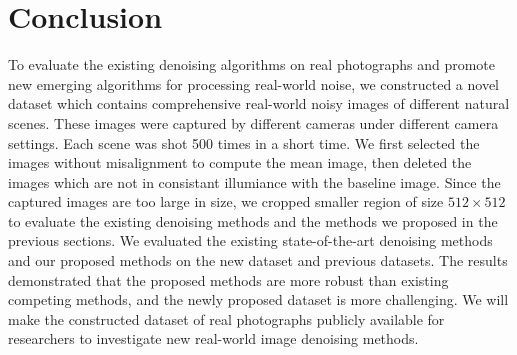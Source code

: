 \section{Conclusion}

To evaluate the existing denoising algorithms on real photographs and promote new emerging algorithms for processing real-world noise, we constructed a novel dataset which contains comprehensive real-world noisy images of different natural scenes. These images were captured by different cameras under different camera settings. Each scene was shot 500 times in a short time. We first selected the images without misalignment to compute the mean image, then deleted the images which are not in consistant illumiance with the baseline image. Since the captured images are too large in size, we cropped smaller region of size $512\times512$ to evaluate the existing denoising methods and the methods we proposed in the previous sections. We evaluated the existing state-of-the-art denoising methods and our proposed methods on the new dataset and previous datasets. The results demonstrated that the proposed methods are more robust than existing competing methods, and the newly proposed dataset is more challenging. We will make the constructed dataset of real photographs publicly available for researchers to investigate new real-world image denoising methods.


















